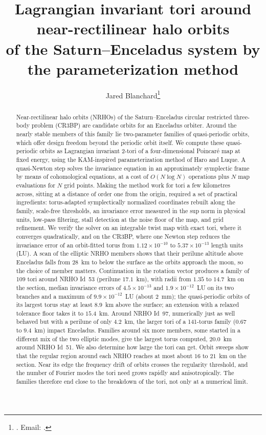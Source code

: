 \documentclass[11pt]{article}
\title{Lagrangian invariant tori around near-rectilinear halo orbits\\
of the Saturn--Enceladus system by the parameterization method}
\author{Jared Blanchard\thanks{\todo{affiliation}. Email: \todo{contact email}.}}
\date{\todo{date / conference}}
\begin{document}
\maketitle

\begin{abstract}
Near-rectilinear halo orbits (NRHOs) of the Saturn--Enceladus circular restricted three-body
problem (CR3BP) are candidate orbits for an Enceladus orbiter. Around the nearly stable members
of this family lie two-parameter families of quasi-periodic orbits, which offer design freedom
beyond the periodic orbit itself. We compute these quasi-periodic orbits as Lagrangian invariant
2-tori of a four-dimensional Poincar\'e map at fixed energy, using the KAM-inspired
parameterization method of Haro and Luque. A quasi-Newton step solves the invariance equation in
an approximately symplectic frame by means of cohomological equations, at a cost of
$O(N\log N)$ operations plus $N$ map evaluations for $N$ grid points. Making the method work for
tori a few kilometres across, sitting at a distance of order one from the origin, required a set
of practical ingredients: torus-adapted symplectically normalized coordinates rebuilt along the
family, scale-free thresholds, an invariance error measured in the sup norm in physical units,
low-pass filtering, stall detection at the noise floor of the map, and grid refinement. We
verify the solver on an integrable twist map with exact tori, where it converges quadratically,
and on the CR3BP, where one Newton step reduces the invariance error of an orbit-fitted torus
from $1.12\times10^{-10}$ to $5.37\times10^{-13}$ length units (LU). A scan of the elliptic NRHO members shows that their perilune altitude above
Enceladus falls from $28$~km to below the surface as the orbits approach the moon, so the choice
of member matters. Continuation in the rotation vector produces a family of 109 tori around NRHO
Id~53 (perilune $17.1$~km), with radii from $1.35$ to $14.7$~km on the section, median invariance
errors of $4.5\times10^{-13}$ and $1.9\times10^{-12}$~LU on its two branches and a maximum of
$9.9\times10^{-12}$~LU (about $2$~mm); the quasi-periodic orbits of its largest torus stay at
least $8.9$~km above the surface; an extension with a relaxed tolerance floor takes it to
$15.4$~km. Around NRHO Id~97, numerically just as well behaved but with a
perilune of only $4.2$~km, the larger tori of a 141-torus family ($0.67$ to $9.4$~km) impact
Enceladus. Families around six more members, some started in a different mix of the two
elliptic modes, give the largest torus computed, $20.0$~km around NRHO Id~51. We also determine
how large the tori can get. Orbit sweeps show that the regular region around each NRHO reaches at
most about $16$ to $21$~km on the section. Near its edge the frequency drift of orbits crosses the
regularity threshold, and the number of Fourier modes the tori need grows rapidly and
anisotropically. The families therefore end close to the breakdown of the tori, not only at a
numerical limit.
\end{abstract}
\end{document}
